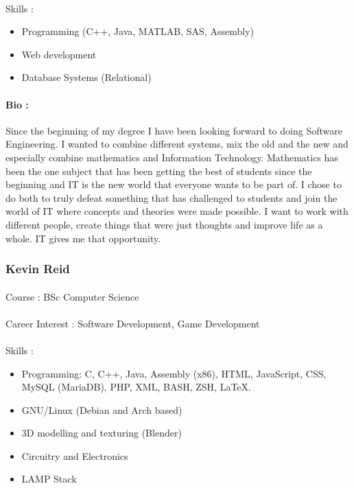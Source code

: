\documentclass[11pt]{article}
\begin{document}
\paragraph{}Skills : 
\begin{itemize}
\item Programming (C++, Java, MATLAB, SAS, Assembly)
\item Web development
\item Database Systems (Relational)
\end{itemize}
\paragraph{Bio :} Since the beginning of my degree I have been looking forward to doing 
Software Engineering. I wanted to combine different systems, mix the old 
and the new and especially combine mathematics and Information 
Technology. Mathematics has been the one subject that has been getting 
the best of students since the beginning and IT is the new world that 
everyone wants to be part of. I chose to do both to truly defeat something 
that has challenged to students and join the world of IT where concepts 
and theories were made possible. I want to work with different people, 
create things that were just thoughts and improve life as a whole. IT gives 
me that opportunity.

\subsubsection{Kevin Reid}
\paragraph{}Course : BSc Computer Science
\paragraph{}Career Interest : Software Development, Game Development
\paragraph{}Skills : 
\begin{itemize}
\item Programming: C, C++, Java, Assembly (x86), HTML, JavaScript, CSS, MySQL (MariaDB), PHP, XML, BASH, ZSH, LaTeX.
\item GNU/Linux (Debian and Arch based)
\item 3D modelling and texturing (Blender)
\item Circuitry and Electronics
\item LAMP Stack
\end{itemize}
\end{document}
